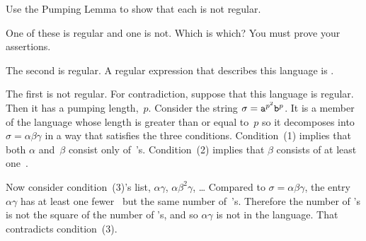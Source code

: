 \documentclass[noanswers, nolegalese, 11pt]{examjh}
\begin{document}
\thispagestyle{empty}
\vspace{-1ex}
\makebox[\textwidth]{\hbox{}\hrulefill\hbox{}}


\begin{questions}
\question
Use the Pumping Lemma to show that each is not regular.

\question
One of these is regular and one is not.
Which is which?
You must prove your assertions.
\begin{solution}
  The second is regular.
  A regular expression that describes this language is 
  .

  The first is not regular.
  For contradiction, suppose that this language is regular.
  Then it has a pumping length,~$p$.
  Consider the string $\sigma=\texttt{a}^{p^2}\texttt{b}^p$.
  It is a member of the language whose length is greater than or equal to~$p$
  so it decomposes into $\sigma=\alpha\beta\gamma$ in a way that satisfies the
  three conditions.
  Condition~(1) implies that both $\alpha$ and~$\beta$ consist only of~'s.
  Condition~(2) implies that $\beta$ consists of at least one~.

  Now consider condition~(3)'s list, $\alpha\gamma$,
  $\alpha\beta^2\gamma$, \ldots{}\sentencespace
  Compared to $\sigma=\alpha\beta\gamma$, the entry $\alpha\gamma$ has 
  at least one fewer~ but the same number of~'s.
  Therefore the number of 's is not the square of the number
  of 's, and so $\alpha\gamma$ is not in the language.
  That contradicts condition~(3).  
\end{solution}


\end{questions}
\end{document}
